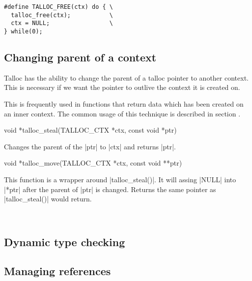 \begin{lstlisting}[caption={TALLOC_FREE(ctx)},label=lst:TALLOC_FREE]
#define TALLOC_FREE(ctx) do { \
  talloc_free(ctx);           \
  ctx = NULL;                 \
} while(0);
\end{lstlisting}



\subsection{Changing parent of a context}
\label{talloc:subsec:stealing}

Talloc has the ability to change the parent of a talloc pointer to another
context. This is necessary if we want the pointer to outlive the context it is
created on.

This is frequently used in functions that return data which has been created on
an inner context. The common usage of this technique is described in section
.

\begin{funcproto}
void *talloc_steal(TALLOC_CTX *ctx, const void *ptr)
\end{funcproto}
\begin{funcdesc}
  Changes the parent of the |ptr| to |ctx| and returns |ptr|.
\end{funcdesc}
\begin{funcproto}
void *talloc_move(TALLOC_CTX *ctx, const void **ptr)
\end{funcproto}
\begin{funcdesc}
  This function is a wrapper around |talloc_steal()|. It will assing |NULL| into
  |*ptr| after the parent of |ptr| is changed. Returns the same pointer as
  |talloc_steal()| would return.
\end{funcdesc}
\
\subsection{Dynamic type checking}
\label{talloc:subsec:type-checking}


\subsection{Managing references}
\label{talloc:subsec:references}

